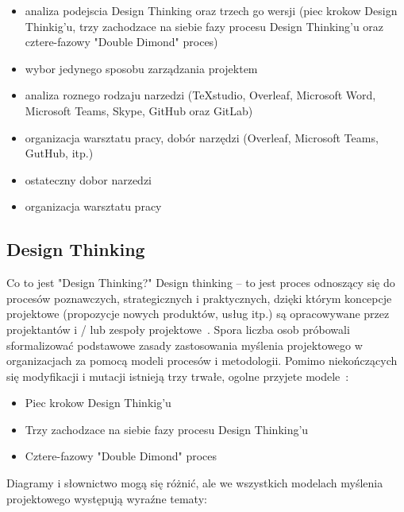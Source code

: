 \documentclass[a4paper,titleauthor]{mwart}
\begin{document}
\begin{itemize}
	\item analiza podejscia Design Thinking oraz trzech go wersji (piec krokow Design Thinkig'u, trzy zachodzace na siebie fazy procesu Design Thinking'u oraz cztere-fazowy "Double Dimond" proces)
	\item wybor jedynego sposobu zarządzania projektem
	\item analiza roznego rodzaju narzedzi (TeXstudio, Overleaf, Microsoft Word, Microsoft Teams, Skype, GitHub oraz GitLab)
	\item organizacja warsztatu pracy, dobór narzędzi (Overleaf, Microsoft Teams, GutHub, itp.)
	\item ostateczny dobor narzedzi
	\item organizacja warsztatu pracy
\end{itemize}

\subsection{Design Thinking}
\label{sec:design_thinking}
Co to jest "Design Thinking?" \newline
\newline
Design thinking – to jest proces odnoszący się do procesów poznawczych, strategicznych i praktycznych, dzięki którym koncepcje projektowe (propozycje nowych produktów, usług itp.) są opracowywane przez projektantów i / lub zespoły projektowe~\cite{DesignThinking1}. \newline \newline Spora liczba osob próbowali sformalizować podstawowe zasady zastosowania myślenia projektowego w organizacjach za pomocą modeli procesów i metodologii. Pomimo niekończących się modyfikacji i mutacji istnieją trzy trwałe, ogolne przyjete modele~\cite{DesignThinking2}:

 \begin{itemize}
 	\item Piec krokow Design Thinkig'u
 	\item Trzy zachodzace na siebie fazy procesu Design Thinking'u
 	\item Cztere-fazowy "Double Dimond" proces
 \end{itemize}

Diagramy i słownictwo mogą się różnić, ale we wszystkich modelach myślenia projektowego występują wyraźne tematy:
\end{document}
